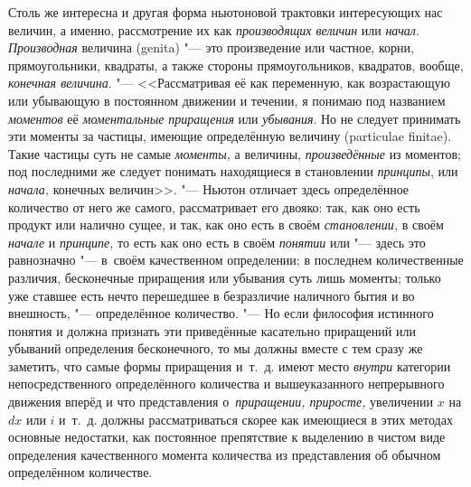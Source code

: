 Столь же интересна и другая форма ньютоновой трактовки интересующих нас
величин, а именно, рассмотрение их как {\em производящих величин} или
{\em начал}. {\em Производная} величина (genita) "--- это произведение или
частное, корни, прямоугольники, квадраты, а также стороны прямоугольников,
квадратов, вообще, {\em конечная величина}. "--- <<Рассматривая её как
переменную, как возрастающую или убывающую в постоянном движении и течении,
я понимаю под названием {\em моментов} её {\em моментальные приращения} или
{\em убывания}. Но не следует принимать эти моменты за частицы, имеющие
определённую величину (particulae finitae). Такие частицы суть не самые
{\em моменты,} а величины, {\em произведённые} из моментов; под последними же
следует понимать находящиеся в становлении {\em принципы}, или {\em начала,}
конечных величин>>. "--- Ньютон отличает здесь определённое количество от него
же самого, рассматривает его двояко: так, как оно есть продукт или налично
сущее, и так, как оно есть в своём {\em становлении,} в своём {\em начале} и
{\em принципе,} то есть как оно есть в своём {\em понятии} или "--- здесь это
равнозначно "--- в~своём качественном определении; в последнем количественные
различия, бесконечные приращения или убывания суть лишь моменты; только уже
ставшее есть нечто перешедшее в безразличие наличного бытия и во внешность,
"--- определённое количество. "--- Но если философия истинного понятия и должна
признать эти приведённые касательно приращений или убываний определения
бесконечного, то мы должны вместе с тем сразу же заметить, что самые формы
приращения и~т.~д. имеют место {\em внутри} категории непосредственного
определённого количества и вышеуказанного непрерывного движения вперёд и что
представления о~{\em приращении, приросте,} увеличении $x$ на
$dx$ или $i$ и~т.~д. должны рассматриваться скорее как имеющиеся в этих
методах основные недостатки, как постоянное препятствие к выделению в чистом
виде определения качественного момента количества из представления об обычном
определённом количестве.


